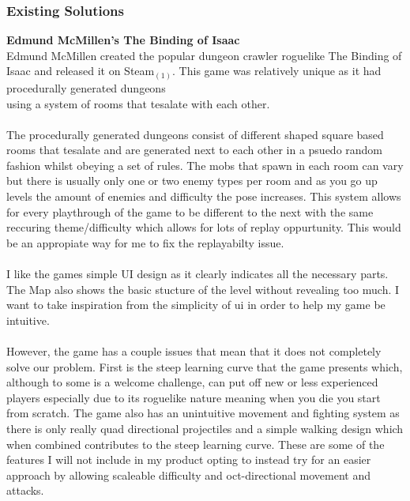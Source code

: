 \documentclass{article}
\begin{document}
        \subsubsection{Existing Solutions}
        \textbf{Edmund McMillen's The Binding of Isaac}\\
        Edmund McMillen created the popular dungeon crawler roguelike The Binding of Isaac and released it on Steam$_{(1)}$.
        This game was relatively unique as it had procedurally generated dungeons \\using a system of rooms that tesalate with each other.\\
        \\
        The procedurally generated dungeons consist of different shaped square based rooms that tesalate and are generated next to each other in a psuedo random fashion whilst obeying a set of rules. The mobs that spawn in each room can vary but there is usually only one or two enemy types per room and as you go up levels the amount of enemies and difficulty the pose increases. This system allows for every playthrough of the game to be different to the next with the same reccuring theme/difficulty which allows for lots of replay oppurtunity. This would be an appropiate way for me to fix the replayabilty issue.\\
        \\
        I like the games simple UI design as it clearly indicates all the necessary parts. The Map also shows the basic stucture of the level without revealing too much. I want to take inspiration from the simplicity of ui in order to help my game be intuitive.\\
        \\
        However, the game has a couple issues that mean that it does not completely solve our problem. First is the steep learning curve that the game presents which, although to some is a welcome challenge, can put off new or less experienced players especially due to its roguelike nature meaning when you die you start from scratch. The game also has an unintuitive movement and fighting system as there is only really quad directional projectiles and a simple walking design which when combined contributes to the steep learning curve. These are some of the features I will not include in my product opting to instead try for an easier approach by allowing scaleable difficulty and oct-directional movement and attacks.\\
\end{document}
